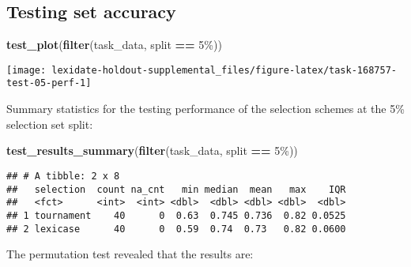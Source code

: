 \documentclass[
]{book}
\newenvironment{Shaded}{\begin{snugshade}}{\end{snugshade}}
\newcommand{\AttributeTok}[1]{\textcolor[rgb]{0.13,0.29,0.53}{#1}}
\newcommand{\DecValTok}[1]{\textcolor[rgb]{0.00,0.00,0.81}{#1}}
\newcommand{\FunctionTok}[1]{\textcolor[rgb]{0.13,0.29,0.53}{\textbf{#1}}}
\newcommand{\NormalTok}[1]{#1}
\newcommand{\OtherTok}[1]{\textcolor[rgb]{0.56,0.35,0.01}{#1}}
\newcommand{\SpecialCharTok}[1]{\textcolor[rgb]{0.81,0.36,0.00}{\textbf{#1}}}
\newcommand{\StringTok}[1]{\textcolor[rgb]{0.31,0.60,0.02}{#1}}
\begin{document}
\hypertarget{testing-set-accuracy-20}{%
\subsection{Testing set accuracy}\label{testing-set-accuracy-20}}

\begin{Shaded}
\begin{Highlighting}[]
\FunctionTok{test\_plot}\NormalTok{(}\FunctionTok{filter}\NormalTok{(task\_data, split }\SpecialCharTok{==} \StringTok{\textquotesingle{}5\%\textquotesingle{}}\NormalTok{))}
\end{Highlighting}
\end{Shaded}

\texttt{[image: lexidate-holdout-supplemental\_files/figure-latex/task-168757-test-05-perf-1]}

Summary statistics for the testing performance of the selection schemes at the 5\% selection set split:

\begin{Shaded}
\begin{Highlighting}[]
\FunctionTok{test\_results\_summary}\NormalTok{(}\FunctionTok{filter}\NormalTok{(task\_data, split }\SpecialCharTok{==} \StringTok{\textquotesingle{}5\%\textquotesingle{}}\NormalTok{))}
\end{Highlighting}
\end{Shaded}

\begin{verbatim}
## # A tibble: 2 x 8
##   selection  count na_cnt   min median  mean   max    IQR
##   <fct>      <int>  <int> <dbl>  <dbl> <dbl> <dbl>  <dbl>
## 1 tournament    40      0  0.63  0.745 0.736  0.82 0.0525
## 2 lexicase      40      0  0.59  0.74  0.73   0.82 0.0600
\end{verbatim}

The permutation test revealed that the results are:

\begin{Shaded}
\end{Shaded}
\end{document}
